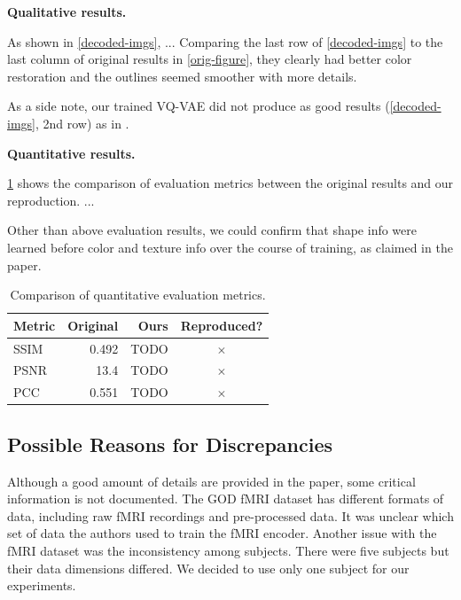 \documentclass{article}
\theoremstyle{plain}
\theoremstyle{definition}
\theoremstyle{remark}
\begin{document}
\textbf{Qualitative results.}
\todo

As shown in \cref{decoded-imgs}, ...
Comparing the last row of \cref{decoded-imgs} to the last column of original results in \cref{orig-figure}, they clearly had better color restoration and the outlines seemed smoother with more details.


As a side note, our trained VQ-VAE did not produce as good results (\cref{decoded-imgs}, 2nd row) as in \cite{oordNeuralDiscreteRepresentation2018}.


\textbf{Quantitative results.}
\todo 

\cref{metric-table} shows the comparison of evaluation metrics between the original results and our reproduction. ...

\medskip

Other than above evaluation results, we could confirm that shape info were learned before color and texture info over the course of training, as claimed in the paper.


\begin{table}[b]
\caption{Comparison of quantitative evaluation metrics.}
\label{metric-table}
\vskip 0.15in
\begin{center}
\begin{small}
\begin{sc}
\begin{tabular}{lrrc}
\toprule
Metric & Original & Ours & Reproduced? \\
\midrule
SSIM    & 0.492 & TODO & $\times$ \\
PSNR    & 13.4 &  TODO & $\times$ \\
PCC     & 0.551 & TODO & $\times$ \\
\bottomrule
\end{tabular}
\end{sc}
\end{small}
\end{center}
\vskip -0.1in
\end{table}

\subsection{Possible Reasons for Discrepancies}
Although a good amount of details are provided in the paper, some critical information is not documented. The GOD fMRI dataset \cite{horikawa2016} has different formats of data, including raw fMRI recordings and pre-processed data. It was unclear which set of data the authors used to train the fMRI encoder. Another issue with the fMRI dataset was the inconsistency among subjects. There were five subjects but their data dimensions differed. We decided to use only one subject for our experiments.
\end{document}
